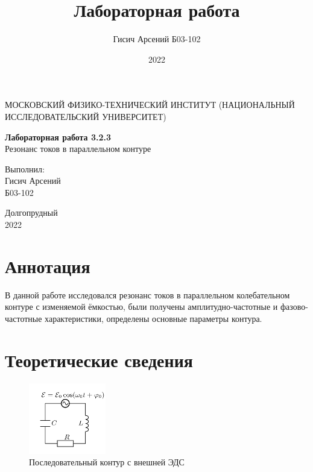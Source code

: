 \documentclass[a4paper, 12pt]{article}
\title{Лабораторная работа}
\author{Гисич Арсений Б03-102}
\date{2022}
\begin{document}
	\begin{center}
		{\large МОСКОВСКИЙ ФИЗИКО-ТЕХНИЧЕСКИЙ ИНСТИТУТ (НАЦИОНАЛЬНЫЙ ИССЛЕДОВАТЕЛЬСКИЙ УНИВЕРСИТЕТ)}
	\end{center}
	\vspace{5 cm}
	{\Large
		\begin{center}
			{\bf Лабораторная работа 3.2.3}\\[0.2 cm]
			Резонанс токов в параллельном контуре
		\end{center}
	}
	\vspace{4 cm}
	\begin{flushright}
		{\Large Выполнил: \\
			\vspace{0.2 cm}
			Гисич Арсений \\
			\vspace{0.2 cm}
			Б03-102 \\}
	\end{flushright}
	\vspace{9 cm}
	\begin{center}
		Долгопрудный\\[0.1 cm]
		2022
	\end{center}
\thispagestyle{empty}

\section{Аннотация}

В данной работе исследовался резонанс токов в параллельном колебательном контуре с изменяемой ёмкостью, были получены амплитудно-частотные и фазово-частотные характеристики, определены основные параметры контура.

\section{Теоретические сведения}

\begin{figure}
\includegraphics[width=0.3\textwidth]{1.png}
\caption{Последовательный контур с внешней ЭДС}
\label{r1}
\end{figure}
\end{document}
